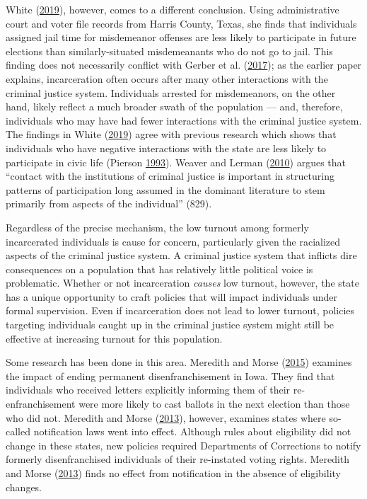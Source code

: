\documentclass[]{article}
\begin{document}
White (\protect\hyperlink{ref-White2019}{2019}), however, comes to a different conclusion. Using administrative court and voter file records from Harris County, Texas, she finds that individuals assigned jail time for misdemeanor offenses are less likely to participate in future elections than similarly-situated misdemeanants who do not go to jail. This finding does not necessarily conflict with Gerber et al. (\protect\hyperlink{ref-Gerber2017}{2017}); as the earlier paper explains, incarceration often occurs after many other interactions with the criminal justice system. Individuals arrested for misdemeanors, on the other hand, likely reflect a much broader swath of the population --- and, therefore, individuals who may have had fewer interactions with the criminal justice system. The findings in White (\protect\hyperlink{ref-White2019}{2019}) agree with previous research which shows that individuals who have negative interactions with the state are less likely to participate in civic life (Pierson \protect\hyperlink{ref-Pierson1993}{1993}). Weaver and Lerman (\protect\hyperlink{ref-Weaver2010}{2010}) argues that ``contact with the institutions of criminal justice is important in structuring patterns of participation long assumed in the dominant literature to stem primarily from aspects of the individual'' (829).

Regardless of the precise mechanism, the low turnout among formerly incarcerated individuals is cause for concern, particularly given the racialized aspects of the criminal justice system. A criminal justice system that inflicts dire consequences on a population that has relatively little political voice is problematic. Whether or not incarceration \emph{causes} low turnout, however, the state has a unique opportunity to craft policies that will impact individuals under formal supervision. Even if incarceration does not lead to lower turnout, policies targeting individuals caught up in the criminal justice system might still be effective at increasing turnout for this population.

Some research has been done in this area. Meredith and Morse (\protect\hyperlink{ref-Meredith2015}{2015}) examines the impact of ending permanent disenfranchisement in Iowa. They find that individuals who received letters explicitly informing them of their re-enfranchisement were more likely to cast ballots in the next election than those who did not. Meredith and Morse (\protect\hyperlink{ref-Meredith2013}{2013}), however, examines states where so-called notification laws went into effect. Although rules about eligibility did not change in these states, new policies required Departments of Corrections to notify formerly disenfranchised individuals of their re-instated voting rights. Meredith and Morse (\protect\hyperlink{ref-Meredith2013}{2013}) finds no effect from notification in the absence of eligibility changes.
\end{document}
